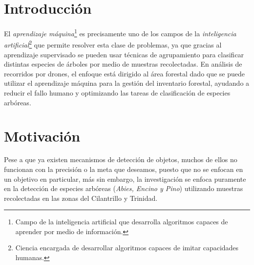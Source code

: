 \documentclass[a0,portrait]{a0poster}
\begin{document}
\vspace{1cm} %


\begin{multicols}{2} %


\color{Black} %

\section*{Introducción}
El \emph{aprendizaje máquina}\footnote{Campo de la inteligencia artificial que desarrolla algoritmos capaces de aprender por medio de información.} es precisamente uno de los campos de la \emph{inteligencia artificial}\footnote{Ciencia encargada de desarrollar algoritmos capaces de imitar capacidades humanas.} que permite resolver esta clase de problemas, ya que gracias al aprendizaje supervisado se pueden usar técnicas de agrupamiento para clasificar distintas especies de árboles por medio de muestras recolectadas. En análisis de recorridos por drones, el enfoque está dirigido al área forestal dado que se puede utilizar el aprendizaje máquina para la gestión del inventario forestal, ayudando a reducir el fallo humano y optimizando las tareas de clasificación de especies arbóreas.


\section*{Motivación}
Pese a que ya existen mecanismos de detección de objetos, muchos de ellos no funcionan con la precisión o la meta que deseamos, puesto que no se enfocan en un objetivo en particular, más sin embargo, la investigación se enfoca puramente en la detección de especies arbóreas (\emph{Abies, Encino y Pino}) utilizando muestras recolectadas en las zonas del Cilantrillo y Trinidad.


\end{multicols}
\end{document}
